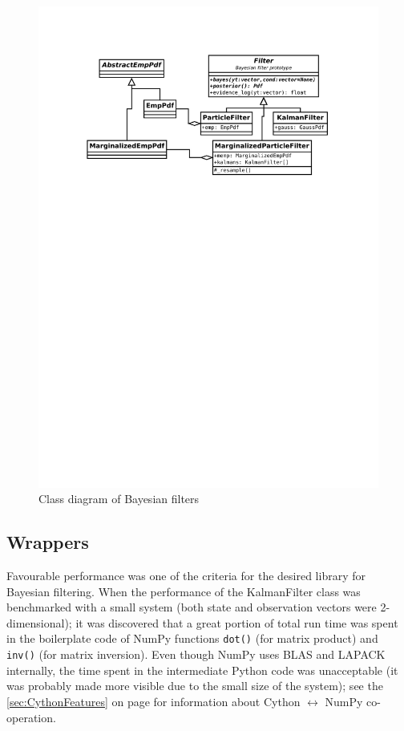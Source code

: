 \begin{figure}[h]
	\centering
	\includegraphics[width=\textwidth,keepaspectratio=true,clip=true,trim=3cm 192mm 3cm 3cm]{./diagrams/filters.pdf}
	\vspace{-8mm}
	\caption{Class diagram of Bayesian filters}
	\label{fig:DiaFilters}
\end{figure}

\subsection{Wrappers} \label{sec:PyBayesWrappers}

Favourable performance was one of the criteria for the desired library for Bayesian filtering. When
the performance of the KalmanFilter class was benchmarked with a small system (both state and
observation vectors were 2-dimensional); it was discovered that a great portion of total run time
was spent in the boilerplate code of NumPy functions \verb|dot()| (for matrix product) and
\verb|inv()| (for matrix inversion). Even though NumPy uses BLAS and LAPACK internally, the time
spent in the intermediate Python code was unacceptable (it was probably made more visible due to
the small size of the system); see the \autoref{sec:CythonFeatures} on page
\pageref{sec:CythonFeatures} for information about Cython \(\leftrightarrow \) NumPy co-operation.


